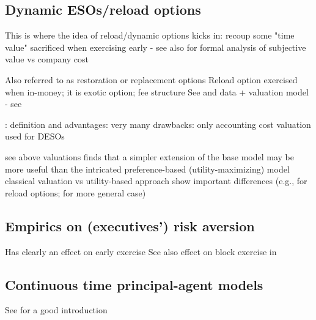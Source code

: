 \subsection{Dynamic ESOs/reload options} %
    This is where the idea of reload/dynamic options kicks in: recoup some "time value" sacrificed when exercising early - see also \cite{hall2002stock} for formal analysis of subjective value vs company cost

    Also referred to as restoration or replacement options
    Reload option exercised when in-money; it is exotic option; fee structure \cite{zhang2010knightian}
    See \cite{hemmer1998optimal} and \cite{hemmer2000reload}
    data + valuation model - see \cite{dybvig2003employee}


    \cite{huang2013dynamic}:
        definition and 
        advantages: very many
        drawbacks: only accounting cost
        valuation used for DESOs

    see above valuations 
    \cite{carpenter1998exercise} finds that a simpler extension of the base model may be more useful than the intricated preference-based (utility-maximizing) model
    classical valuation vs utility-based approach show important differences (e.g., \cite{lau2005valuation} for reload options; \cite{ingersoll2006subjective} for more general case)


 



\subsection{Empirics on (executives') risk aversion} %

    Has clearly an effect on early exercise \cite{izhakian2017risk} \cite{murphy2019employees}
    See also effect on block exercise in \cite{grasselli2009risk}





\subsection{Continuous time principal-agent models} %
    See \cite{cvitanic2013dynamics} for a good introduction




